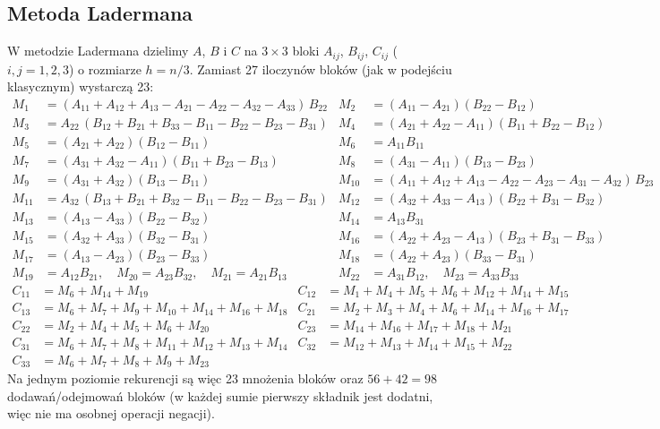 \documentclass[11pt,a4paper]{article}
\begin{document}
\subsection{Metoda Ladermana}
W metodzie Ladermana dzielimy $A$, $B$ i $C$ na $3\times3$ bloki $A_{ij}$, $B_{ij}$, $C_{ij}$ ($i,j=1,2,3$)
o rozmiarze $h=n/3$. Zamiast 27 iloczynów bloków (jak w podejściu klasycznym) wystarczą 23:
{\small
\begin{equation}\label{eq:laderman-m}
\begin{aligned}
M_{1}  &= (A_{11}{+}A_{12}{+}A_{13}{-}A_{21}{-}A_{22}{-}A_{32}{-}A_{33})\,B_{22} &
M_{2}  &= (A_{11}{-}A_{21})(B_{22}{-}B_{12}) \\
M_{3}  &= A_{22}\,(B_{12}{+}B_{21}{+}B_{33}{-}B_{11}{-}B_{22}{-}B_{23}{-}B_{31}) &
M_{4}  &= (A_{21}{+}A_{22}{-}A_{11})(B_{11}{+}B_{22}{-}B_{12}) \\
M_{5}  &= (A_{21}{+}A_{22})(B_{12}{-}B_{11}) &
M_{6}  &= A_{11}B_{11} \\
M_{7}  &= (A_{31}{+}A_{32}{-}A_{11})(B_{11}{+}B_{23}{-}B_{13}) &
M_{8}  &= (A_{31}{-}A_{11})(B_{13}{-}B_{23}) \\
M_{9}  &= (A_{31}{+}A_{32})(B_{13}{-}B_{11}) &
M_{10} &= (A_{11}{+}A_{12}{+}A_{13}{-}A_{22}{-}A_{23}{-}A_{31}{-}A_{32})\,B_{23} \\
M_{11} &= A_{32}\,(B_{13}{+}B_{21}{+}B_{32}{-}B_{11}{-}B_{22}{-}B_{23}{-}B_{31}) &
M_{12} &= (A_{32}{+}A_{33}{-}A_{13})(B_{22}{+}B_{31}{-}B_{32}) \\
M_{13} &= (A_{13}{-}A_{33})(B_{22}{-}B_{32}) &
M_{14} &= A_{13}B_{31} \\
M_{15} &= (A_{32}{+}A_{33})(B_{32}{-}B_{31}) &
M_{16} &= (A_{22}{+}A_{23}{-}A_{13})(B_{23}{+}B_{31}{-}B_{33}) \\
M_{17} &= (A_{13}{-}A_{23})(B_{23}{-}B_{33}) &
M_{18} &= (A_{22}{+}A_{23})(B_{33}{-}B_{31}) \\
M_{19} &= A_{12}B_{21},\quad M_{20} = A_{23}B_{32},\quad M_{21} = A_{21}B_{13} &
M_{22} &= A_{31}B_{12},\quad M_{23} = A_{33}B_{33}
\end{aligned}
\end{equation}
\begin{equation}\label{eq:laderman-c}
\begin{aligned}
C_{11} &= M_6{+}M_{14}{+}M_{19} &
C_{12} &= M_1{+}M_4{+}M_5{+}M_6{+}M_{12}{+}M_{14}{+}M_{15} \\
C_{13} &= M_6{+}M_7{+}M_9{+}M_{10}{+}M_{14}{+}M_{16}{+}M_{18} &
C_{21} &= M_2{+}M_3{+}M_4{+}M_6{+}M_{14}{+}M_{16}{+}M_{17} \\
C_{22} &= M_2{+}M_4{+}M_5{+}M_6{+}M_{20} &
C_{23} &= M_{14}{+}M_{16}{+}M_{17}{+}M_{18}{+}M_{21} \\
C_{31} &= M_6{+}M_7{+}M_8{+}M_{11}{+}M_{12}{+}M_{13}{+}M_{14} &
C_{32} &= M_{12}{+}M_{13}{+}M_{14}{+}M_{15}{+}M_{22} \\
C_{33} &= M_6{+}M_7{+}M_8{+}M_9{+}M_{23}
\end{aligned}
\end{equation}
}%
Na jednym poziomie rekurencji są więc 23 mnożenia bloków oraz $56+42=98$ dodawań/odejmowań bloków
(w każdej sumie pierwszy składnik jest dodatni, więc nie ma osobnej operacji negacji).
\end{document}
